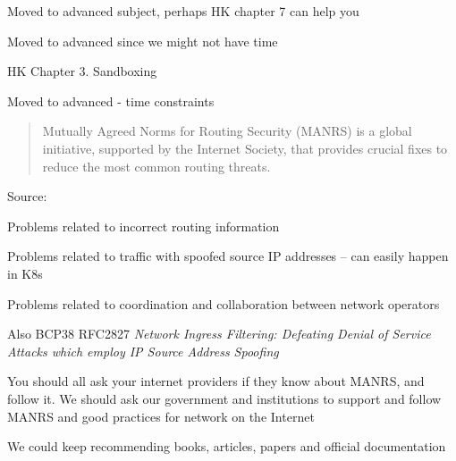 \documentclass[Screen16to9,17pt]{foils}
\begin{document}
\begin{list2}
\item Moved to advanced subject, perhaps HK chapter 7 can help you
\end{list2}



\begin{list2}
\item  Moved to advanced since we might not have time
\item HK Chapter 3. Sandboxing
\end{list2}


Moved to advanced - time constraints



\begin{quote}
  Mutually Agreed Norms for Routing Security (MANRS) is a global initiative, supported by the Internet Society, that provides crucial fixes to reduce the most common routing threats. ﻿
\end{quote}
Source: {\small{}}

\begin{list2}
\item Problems related to incorrect routing information
\item Problems related to traffic with spoofed source IP addresses -- can easily happen in K8s
\item Problems related to coordination and collaboration between network operators
\item Also BCP38 RFC2827 \emph{Network Ingress Filtering: Defeating Denial of Service Attacks
which employ IP Source Address Spoofing}
\end{list2}

You should all ask your internet providers if they know about MANRS, and follow it. We should ask our government and institutions to support and follow MANRS and good practices for network on the Internet


We could keep recommending books, articles, papers and official documentation
\end{document}
